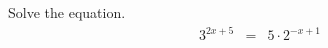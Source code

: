 \begin{frame}
\begin{example}
Solve the equation.
\[\begin{array}{rclll}
3^{2x+5}&=&5\cdot 2^{-x+1}\\

\end{array}
\]
\end{example}
\end{frame}
